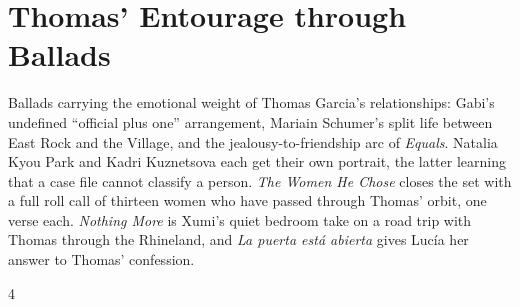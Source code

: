 \documentclass[a4paper,landscape]{memoir}
\begin{document}
\chapter{Thomas' Entourage through Ballads}
Ballads carrying the emotional weight of Thomas Garcia's relationships: Gabi's undefined ``official plus one'' arrangement, Mariain Schumer's split life between East Rock and the Village, and the jealousy-to-friendship arc of \emph{Equals}. Natalia Kyou Park and Kadri Kuznetsova each get their own portrait, the latter learning that a case file cannot classify a person. \emph{The Women He Chose} closes the set with a full roll call of thirteen women who have passed through Thomas' orbit, one verse each. \emph{Nothing More} is Xumi's quiet bedroom take on a road trip with Thomas through the Rhineland, and \emph{La puerta está abierta} gives Lucía her answer to Thomas' confession.
\clearpage\begin{multicols*}{4}
\end{multicols*}
\end{document}
